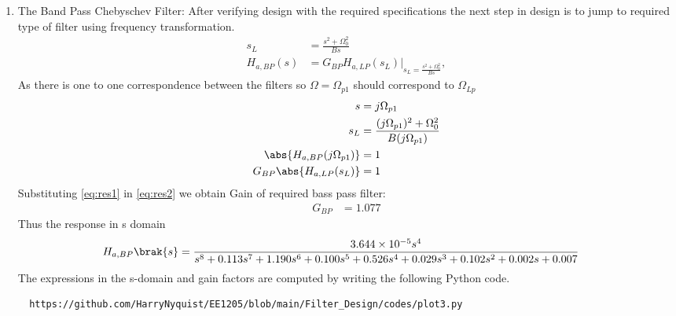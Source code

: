 \documentclass{article}
\begin{document}
\begin{enumerate}
\item {The Band Pass Chebyschev Filter:} 
After verifying design with the required specifications the next step in design is to jump to required type of filter using frequency transformation. 
\begin{align}
    s_L &= \frac{s^2 + \Omega_0^2}{Bs} \\
    H_{a,BP}(s) &= G_{BP}H_{a,LP}(s_L)\vert_{s_L = \frac{s^2 + \Omega_0^2}{Bs}},
\end{align}
As there is one to one correspondence between the filters so $\Omega=\Omega_{p1}$ should correspond to $\Omega_{Lp}$
\begin{align}
    s &= j\Omega_{p1}\\
    s_{L} &= \frac{(j\Omega_{p1})^2 + \Omega_0^2}{B(j\Omega_{p1})} \label{eq:res1} \\ 
    \abs{H_{a,BP}(j\Omega_{p1})} &= 1 \\
    G_{BP}\abs{H_{a,LP}(s_L)} &= 1 \label{eq:res2}
\end{align}
Substituting \eqref{eq:res1} in \eqref{eq:res2} we obtain Gain of required bass pass filter:
\begin{align}
    G_{BP} &= 1.077
\end{align}
Thus the response in s domain 
\begin{align}
    H_{a,BP}\brak{s} &= \frac{3.644\times 10^{-5}s^4}{s^8 + 0.113s^7 + 1.190s^6 + 0.100s^5 + 0.526s^4 + 0.029s^3 + 0.102s^2 + 0.002s + 0.007} \label{eq:magnitude_bandpass_sdom}
\end{align}
The expressions in the s-domain and gain factors are computed by writing the following Python code. 
\begin{lstlisting}
  https://github.com/HarryNyquist/EE1205/blob/main/Filter_Design/codes/plot3.py  
\end{lstlisting}
    

\end{enumerate}
\end{document}
